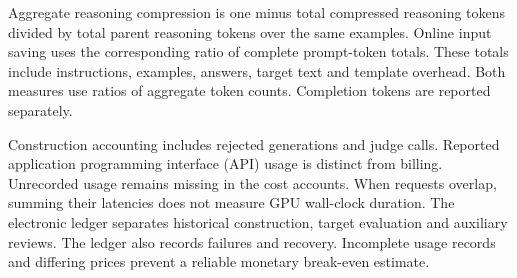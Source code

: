 Aggregate reasoning compression is one minus total compressed reasoning tokens divided by total parent reasoning tokens over the same examples. Online input saving uses the corresponding ratio of complete prompt-token totals. These totals include instructions, examples, answers, target text and template overhead. Both measures use ratios of aggregate token counts. Completion tokens are reported separately.

Construction accounting includes rejected generations and judge calls. Reported application programming interface (API) usage is distinct from billing. Unrecorded usage remains missing in the cost accounts. When requests overlap, summing their latencies does not measure GPU wall-clock duration. The electronic ledger separates historical construction, target evaluation and auxiliary reviews. The ledger also records failures and recovery. Incomplete usage records and differing prices prevent a reliable monetary break-even estimate.

